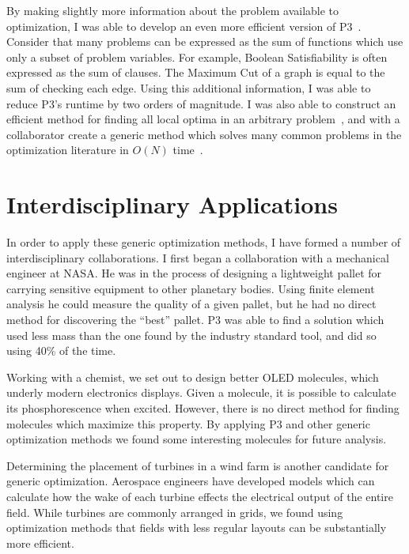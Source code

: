 \documentclass[a4paper, 11pt]{article}
\begin{document}
By making slightly more information about the problem available to optimization, I was
able to develop an even more efficient version of P3~\cite{goldman:2015:GBO}. Consider
that many problems can be expressed as the sum of functions which use only a subset
of problem variables. For example, Boolean Satisfiability is often expressed as the sum
of clauses. The Maximum Cut of a graph is equal to the sum of checking each edge.
Using this additional information, I was able to reduce P3's runtime by two
orders of magnitude. I was also able to construct an efficient method
for finding all local optima in an arbitrary problem~\cite{goldman:2016:hyperplane},
and with a collaborator create a generic method which solves many common
problems in the optimization literature in $O(N)$ time~\cite{whitley:2016:mkl}.

\section{Interdisciplinary Applications}
In order to apply these generic optimization methods, I have formed a number of
interdisciplinary collaborations. I first began a collaboration with a mechanical engineer
at NASA. He was in the process of designing a lightweight pallet for carrying sensitive
equipment to other planetary bodies. Using finite element analysis he could measure
the quality of a given pallet, but he had no direct method for discovering the ``best'' pallet.
P3 was able to find a solution which used less mass than the one found by the industry standard
tool, and did so using 40\% of the time.


Working with a chemist, we set out to
design better OLED molecules, which underly modern electronics displays.
Given a molecule, it is possible to calculate its phosphorescence when excited. However,
there is no direct method for finding molecules which maximize this property.
By applying P3 and other generic optimization methods we found some interesting
molecules for future analysis.

Determining the placement of turbines in a wind farm is another candidate for
generic optimization. Aerospace engineers have developed models which can calculate
how the wake of each turbine effects the electrical output of the entire field.
While turbines are commonly arranged in grids, we found using optimization methods
that fields with less regular layouts can be substantially more efficient.
\end{document}
